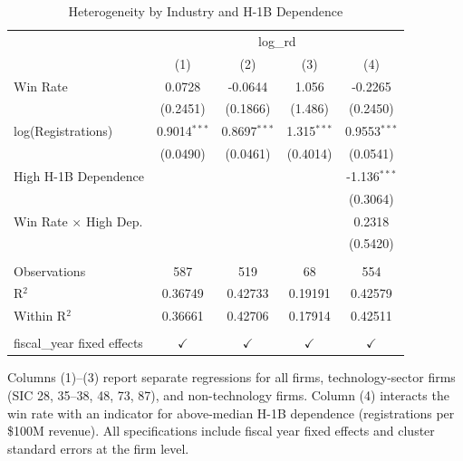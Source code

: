 \begin{table}[htbp]
   \caption{\label{tab:het} Heterogeneity by Industry and H-1B Dependence}
   \bigskip
   \centering
   \begin{tabular}{lcccc}
      \toprule
       & \multicolumn{4}{c}{log\_rd}\\
                                   & (1)            & (2)            & (3)           & (4)\\  
      \midrule 
      Win Rate                     & 0.0728         & -0.0644        & 1.056         & -0.2265\\   
                                   & (0.2451)       & (0.1866)       & (1.486)       & (0.2450)\\   
      log(Registrations)           & 0.9014$^{***}$ & 0.8697$^{***}$ & 1.315$^{***}$ & 0.9553$^{***}$\\   
                                   & (0.0490)       & (0.0461)       & (0.4014)      & (0.0541)\\   
      High H-1B Dependence         &                &                &               & -1.136$^{***}$\\   
                                   &                &                &               & (0.3064)\\   
      Win Rate $\times$ High Dep.  &                &                &               & 0.2318\\   
                                   &                &                &               & (0.5420)\\   
       \\
      Observations                 & 587            & 519            & 68            & 554\\  
      R$^2$                        & 0.36749        & 0.42733        & 0.19191       & 0.42579\\  
      Within R$^2$                 & 0.36661        & 0.42706        & 0.17914       & 0.42511\\  
       \\
      fiscal\_year fixed effects   & $\checkmark$   & $\checkmark$   & $\checkmark$  & $\checkmark$\\   
      \bottomrule
   \end{tabular}
   
   \par \raggedright 
   Columns (1)--(3) report separate regressions for all firms, technology-sector firms (SIC 28, 35--38, 48, 73, 87), and non-technology firms. Column (4) interacts the win rate with an indicator for above-median H-1B dependence (registrations per \$100M revenue). All specifications include fiscal year fixed effects and cluster standard errors at the firm level.
\end{table}
